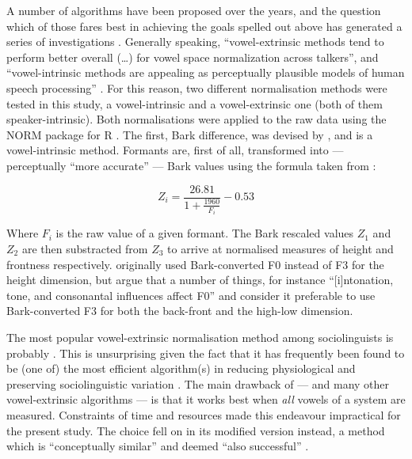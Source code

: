 A number of algorithms have been proposed over the years, and the question which of those fares best in achieving the goals spelled out above has generated a series of investigations \parencites(among others:)(){hindle1978}{disner1980}{adanketal2004}. Generally speaking, ``vowel-extrinsic methods tend to perform better overall (\ldots) for vowel space normalization across talkers'', and ``vowel-intrinsic methods are appealing as perceptually plausible models of human speech processing'' \parencite[1440]{clopper2009}.
For this reason, two different normalisation methods were tested in this study, a vowel-intrinsic and a vowel-extrinsic one (both of them speaker-intrinsic).
Both normalisations were applied to the raw data using the NORM package for R \parencite{kendallthomas2014}.
The first, Bark difference, was devised by \textcite{syrdalgopal1986}, and is a vowel-intrinsic method.
Formants are, first of all, transformed into --- perceptually ``more accurate'' \parencite[1431--1432]{clopper2009} --- Bark values using the formula taken from \textcite{traunmueller1990}:

\begin{equation}
	Z_{i} = \frac{26.81}{1 + \frac{1960}{F_{i}}} - 0.53
\end{equation}

Where \(F_{i}\) is the raw value of a given formant. The Bark rescaled values \(Z_{1}\) and \(Z_{2}\) are then substracted from \(Z_{3}\) to arrive at normalised measures of height and frontness respectively. \citeauthor{syrdalgopal1986} originally used Bark-converted F0 instead of F3 for the height dimension, but \textcite{kendallthomas2014} argue that a number of things, for instance ``[i]ntonation, tone, and consonantal influences affect F0'' and consider it preferable to use Bark-converted F3 for both the back-front and the high-low dimension.

The most popular vowel-extrinsic normalisation method among sociolinguists is probably \textcite{lobanov1971}.
This is unsurprising given the fact that it has frequently been found to be (one of) the most efficient algorithm(s) in reducing physiological and preserving sociolinguistic variation \parencite[cf.][1440]{clopper2009}.
The main drawback of \citeauthor{lobanov1971} --- and many other vowel-extrinsic algorithms --- is that it works best when \emph{all} vowels of a system are measured.
Constraints of time and resources made this endeavour impractical for the present study.
The choice fell on \textcite{wattfabricius2002} in its modified version \parencite{fabriciusetal2009} instead, a method which is ``conceptually similar'' and deemed ``also successful'' \parencite[1440]{clopper2009}.

